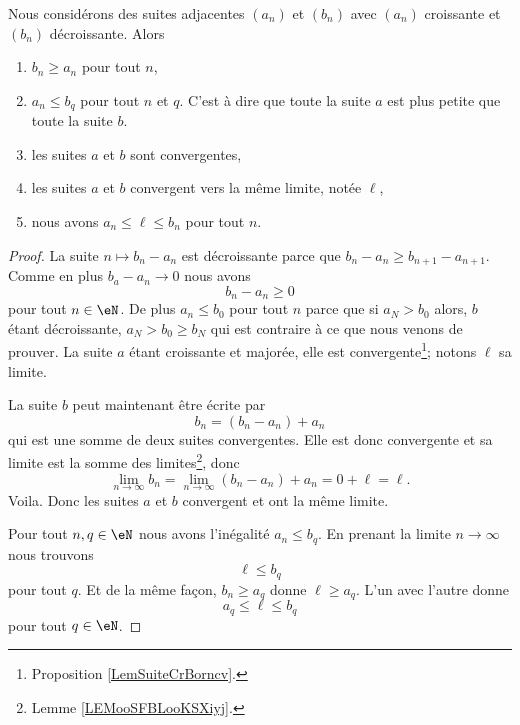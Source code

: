 \begin{theorem}      \label{THOooZJWLooAtGMxD}
    Nous considérons des suites adjacentes \( (a_n)\) et \( (b_n)\) avec \( (a_n)\) croissante et \( (b_n)\) décroissante. Alors
    \begin{enumerate}
        \item
            \( b_n\geq a_n\) pour tout \( n\),
        \item
            \( a_n\leq b_q\) pour tout \( n\) et \( q\). C'est à dire que toute la suite \( a\) est plus petite que toute la suite \( b\).
        \item
            les suites \( a\) et \( b\) sont convergentes,
        \item
            les suites \( a\) et \( b\) convergent vers la même limite, notée \( \ell\),
        \item
            nous avons \( a_n\leq \ell\leq b_n\) pour tout \( n\).
    \end{enumerate}
\end{theorem}

\begin{proof}
    La suite \( n\mapsto b_n-a_n\) est décroissante parce que \( b_n-a_n\geq b_{n+1}-a_{n+1}\). Comme en plus \( b_a-a_n\to 0\) nous avons
    \begin{equation}
        b_n-a_n\geq 0
    \end{equation}
    pour tout \( n\in \eN\). De plus \( a_n\leq b_0\) pour tout \( n\) parce que si \( a_N>b_0\) alors, \( b\) étant décroissante, \( a_N>b_0\geq b_N\) qui est contraire à ce que nous venons de prouver. La suite \( a\) étant croissante et majorée, elle est convergente\footnote{Proposition \ref{LemSuiteCrBorncv}.}; notons \( \ell\) sa limite.

    La suite \( b\) peut maintenant être écrite par
    \begin{equation}
        b_n=(b_n-a_n)+a_n
    \end{equation}
    qui est une somme de deux suites convergentes. Elle est donc convergente et sa limite est la somme des limites\footnote{Lemme \ref{LEMooSFBLooKSXiyj}.}, donc
    \begin{equation}
        \lim_{n\to \infty} b_n=\lim_{n\to \infty} (b_n-a_n)+a_n=0+\ell=\ell.
    \end{equation}
    Voila. Donc les suites \( a\) et \( b\) convergent et ont la même limite.

    Pour tout \( n,q\in \eN\) nous avons l'inégalité \( a_n\leq b_q\). En prenant la limite \( n\to \infty\) nous trouvons
    \begin{equation}
        \ell\leq b_q
    \end{equation}
    pour tout \( q\). Et de la même façon, \( b_n\geq a_q\) donne \( \ell\geq a_q\). L'un avec l'autre donne
    \begin{equation}
        a_q\leq \ell\leq b_q
    \end{equation}
    pour tout \( q\in \eN\).
\end{proof}

